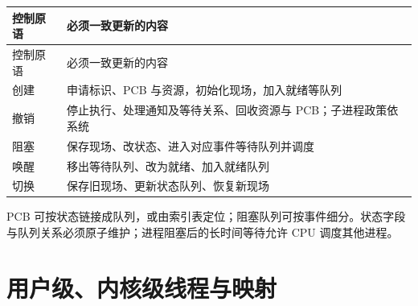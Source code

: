 \par\smallskip
{\fontsize{9.3}{12}\selectfont\setlength{\tabcolsep}{2.5pt}\setlength{\LTleft}{0pt}\setlength{\LTright}{0pt}
\begin{longtable}{@{}>{\raggedright\arraybackslash}p{}>{\raggedright\arraybackslash}p{}@{}}
\toprule
控制原语 & 必须一致更新的内容 \\

\midrule\endfirsthead\toprule
控制原语 & 必须一致更新的内容 \\

\midrule\endhead\bottomrule\endfoot
创建 & 申请标识、PCB 与资源，初始化现场，加入就绪等队列 \\

撤销 & 停止执行、处理通知及等待关系、回收资源与 PCB；子进程政策依系统 \\

阻塞 & 保存现场、改状态、进入对应事件等待队列并调度 \\

唤醒 & 移出等待队列、改为就绪、加入就绪队列 \\

切换 & 保存旧现场、更新状态队列、恢复新现场 \\

\end{longtable}}
\par\smallskip

PCB 可按状态链接成队列，或由索引表定位；阻塞队列可按事件细分。状态字段与队列关系必须原子维护；进程阻塞后的长时间等待允许 CPU 调度其他进程。

\section{用户级、内核级线程与映射}\label{OS02-thread-models}

